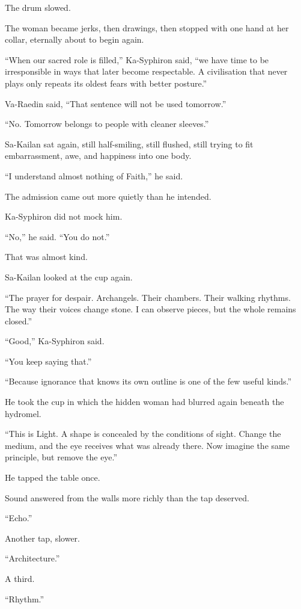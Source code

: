 The drum slowed.\par
The woman became jerks, then drawings, then stopped with one hand at her collar, eternally about to begin again.\par
“When our sacred role is filled,” Ka-Syphiron said, “we have time to be irresponsible in ways that later become respectable. A civilisation that never plays only repeats its oldest fears with better posture.”\par
Va-Raedin said, “That sentence will not be used tomorrow.”\par
“No. Tomorrow belongs to people with cleaner sleeves.”\par
Sa-Kailan sat again, still half-smiling, still flushed, still trying to fit embarrassment, awe, and happiness into one body.\par
“I understand almost nothing of Faith,” he said.\par
The admission came out more quietly than he intended.\par
Ka-Syphiron did not mock him.\par
“No,” he said. “You do not.”\par
That was almost kind.\par
Sa-Kailan looked at the cup again.\par
“The prayer for despair. Archangels. Their chambers. Their walking rhythms. The way their voices change stone. I can observe pieces, but the whole remains closed.”\par
“Good,” Ka-Syphiron said.\par
“You keep saying that.”\par
“Because ignorance that knows its own outline is one of the few useful kinds.”\par
He took the cup in which the hidden woman had blurred again beneath the hydromel.\par
“This is Light. A shape is concealed by the conditions of sight. Change the medium, and the eye receives what was already there. Now imagine the same principle, but remove the eye.”\par
He tapped the table once.\par
Sound answered from the walls more richly than the tap deserved.\par
“Echo.”\par
Another tap, slower.\par
“Architecture.”\par
A third.\par
“Rhythm.”\par
